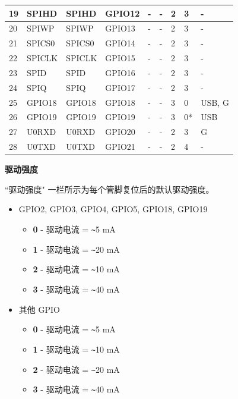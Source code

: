\begin{longtable}[c]{|p{1.5cm}|p{1.9cm}|p{1.5cm}|p{1.5cm}|p{1.5cm}|p{1.5cm}|p{1.0cm}|p{1.0cm}|p{1.0cm}| }
19 & SPIHD           &  SPIHD        & GPIO12  & -          & -            & 2           & 3 & - \\ \hline
20 & SPIWP           &  SPIWP        & GPIO13  & -          & -            & 2           & 3 & - \\ \hline
21 & SPICS0          &  SPICS0       & GPIO14  & -          & -            & 2           & 3 & - \\ \hline
22 & SPICLK          &  SPICLK       & GPIO15  & -          & -            & 2           & 3 & - \\ \hline
23 & SPID            &  SPID         & GPIO16  & -          & -            & 2           & 3 & - \\ \hline
24 & SPIQ            &  SPIQ         & GPIO17  & -          & -            & 2           & 3 & - \\ \hline
25 & GPIO18          &  GPIO18       & GPIO18  & -          & -            & 3           & 0 & USB, G \\ \hline
26 & GPIO19          &  GPIO19       & GPIO19  & -          & -            & 3           & 0* & USB \\ \hline
27 & U0RXD           &  U0RXD        & GPIO20  & -          & -            & 2           & 3 & G \\ \hline
28 & U0TXD           &  U0TXD        & GPIO21  & -          & -            & 2           & 4 & - \\ \hline

    \end{longtable}
\normalsize

\textbf{驱动强度}

``驱动强度" 一栏所示为每个管脚复位后的默认驱动强度。
\begin{itemize}
    \item GPIO2, GPIO3, GPIO4, GPIO5, GPIO18, GPIO19
    \begin{itemize}
        \item \textbf{0} - 驱动电流 = \verb+~+5 mA
        \item \textbf{1} - 驱动电流 = \verb+~+20 mA
        \item \textbf{2} - 驱动电流 = \verb+~+10 mA
        \item \textbf{3} - 驱动电流 = \verb+~+40 mA
    \end{itemize}
    \item 其他 GPIO
    \begin{itemize}
        \item \textbf{0} - 驱动电流 = \verb+~+5 mA
        \item \textbf{1} - 驱动电流 = \verb+~+10 mA
        \item \textbf{2} - 驱动电流 = \verb+~+20 mA
        \item \textbf{3} - 驱动电流 = \verb+~+40 mA
    \end{itemize}
\end{itemize}

